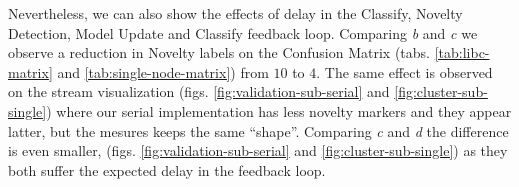 Nevertheless, we can also show the effects of delay in the
Classify, Novelty Detection, Model Update and Classify feedback loop.
Comparing \emph{b} and \emph{c} we observe a reduction in Novelty labels
on the Confusion Matrix (tabs. \ref{tab:libc-matrix} and \ref{tab:single-node-matrix})
from $10$ to $4$.
The same effect is observed on the stream visualization (figs.
\ref{fig:validation-sub-serial} and \ref{fig:cluster-sub-single}) where our
serial implementation has less novelty markers and they appear latter, but the
mesures keeps the same ``shape''.
Comparing \emph{c} and \emph{d} the difference is even smaller,
(figs. \ref{fig:validation-sub-serial} and \ref{fig:cluster-sub-single})
as they both suffer the expected delay in the feedback loop.



%     
%     


%   

